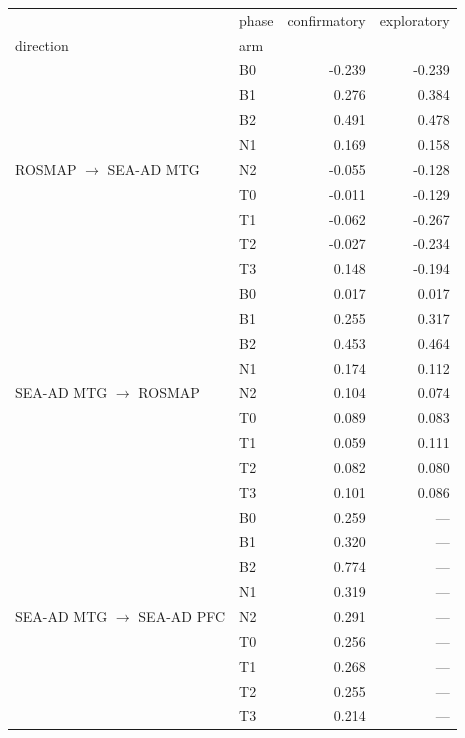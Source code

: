 \begin{tabular}{llrr}
\toprule
 & phase & confirmatory & exploratory \\
direction & arm &  &  \\
\midrule
\multirow[t]{9}{*}{ROSMAP $\to$ SEA-AD MTG} & B0 & -0.239 & -0.239 \\
 & B1 & 0.276 & 0.384 \\
 & B2 & 0.491 & 0.478 \\
 & N1 & 0.169 & 0.158 \\
 & N2 & -0.055 & -0.128 \\
 & T0 & -0.011 & -0.129 \\
 & T1 & -0.062 & -0.267 \\
 & T2 & -0.027 & -0.234 \\
 & T3 & 0.148 & -0.194 \\
\cline{1-4}
\multirow[t]{9}{*}{SEA-AD MTG $\to$ ROSMAP} & B0 & 0.017 & 0.017 \\
 & B1 & 0.255 & 0.317 \\
 & B2 & 0.453 & 0.464 \\
 & N1 & 0.174 & 0.112 \\
 & N2 & 0.104 & 0.074 \\
 & T0 & 0.089 & 0.083 \\
 & T1 & 0.059 & 0.111 \\
 & T2 & 0.082 & 0.080 \\
 & T3 & 0.101 & 0.086 \\
\cline{1-4}
\multirow[t]{9}{*}{SEA-AD MTG $\to$ SEA-AD PFC} & B0 & 0.259 & --- \\
 & B1 & 0.320 & --- \\
 & B2 & 0.774 & --- \\
 & N1 & 0.319 & --- \\
 & N2 & 0.291 & --- \\
 & T0 & 0.256 & --- \\
 & T1 & 0.268 & --- \\
 & T2 & 0.255 & --- \\
 & T3 & 0.214 & --- \\
\cline{1-4}
\bottomrule
\end{tabular}
